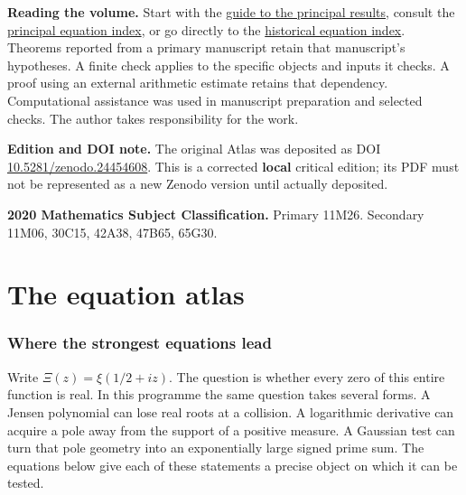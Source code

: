 \documentclass[
  10pt,
  a4paper,
  10pt,
  oneside,
  openany]{book}
\begin{document}
\textbf{Reading the volume.} Start with the \hyperref[atlas-map]{guide
to the principal results}, consult the
\hyperref[atlas-locator]{principal equation index}, or go directly to
the \hyperref[app-equations]{historical equation index}. Theorems
reported from a primary manuscript retain that manuscript's hypotheses.
A finite check applies to the specific objects and inputs it checks. A
proof using an external arithmetic estimate retains that dependency.
Computational assistance was used in manuscript preparation and selected
checks. The author takes responsibility for the work.

\textbf{Edition and DOI note.} The original Atlas was deposited as DOI
\href{https://doi.org/10.5281/zenodo.24454608}{10.5281/zenodo.24454608}.
This is a corrected \textbf{local} critical edition; its PDF must not be
represented as a new Zenodo version until actually deposited.

\textbf{2020 Mathematics Subject Classification.} Primary 11M26.
Secondary 11M06, 30C15, 42A38, 47B65, 65G30.

\part{The equation atlas}

\section{Where the strongest equations lead}\label{atlas-map}

Write \(\Xi(z)=\xi(1/2+iz)\). The question is whether every zero of this
entire function is real. In this programme the same question takes
several forms. A Jensen polynomial can lose real roots at a collision. A
logarithmic derivative can acquire a pole away from the support of a
positive measure. A Gaussian test can turn that pole geometry into an
exponentially large signed prime sum. The equations below give each of
these statements a precise object on which it can be tested.
\end{document}
